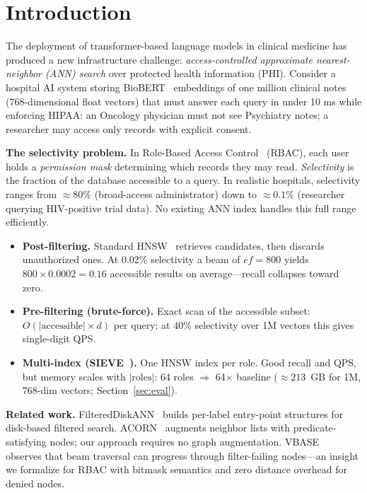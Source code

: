 \section{Introduction}
\label{sec:intro}

The deployment of transformer-based language models in clinical medicine
has produced a new infrastructure challenge: \emph{access-controlled approximate
nearest-neighbor (ANN) search} over protected health information (PHI).
Consider a hospital AI system storing BioBERT~\cite{lee2020biobert} embeddings
of one million clinical notes (768-dimensional float vectors) that must answer
each query in under 10 ms while enforcing HIPAA: an Oncology physician must not
see Psychiatry notes; a researcher may access only records with explicit consent.

\smallskip\noindent\textbf{The selectivity problem.}
In Role-Based Access Control~\cite{ferraiolo2001proposed} (RBAC), each user holds
a \emph{permission mask} determining which records they may read.
\emph{Selectivity} is the fraction of the database accessible to a query.
In realistic hospitals, selectivity ranges from ${\approx}80\%$ (broad-access
administrator) down to ${\approx}0.1\%$ (researcher querying HIV-positive trial data).
No existing ANN index handles this full range efficiently.

\begin{itemize}[leftmargin=1.4em,itemsep=1pt,topsep=2pt]
  \item \textbf{Post-filtering.} Standard HNSW~\cite{malkov2020efficient}
    retrieves candidates, then discards unauthorized ones.
    At 0.02\% selectivity a beam of $\mathit{ef}\!=\!800$ yields
    $800\!\times\!0.0002\!=\!0.16$ accessible results on average---recall
    collapses toward zero.
  \item \textbf{Pre-filtering (brute-force).} Exact scan of the accessible
    subset: $O(|\text{accessible}|\!\times\! d)$ per query; at 40\%
    selectivity over 1M vectors this gives single-digit QPS.
  \item \textbf{Multi-index (SIEVE~\cite{zhang2025sieve}).}
    One HNSW index per role.  Good recall and QPS, but memory scales
    with $|\text{roles}|$: 64 roles $\Rightarrow$ 64$\times$ baseline
    (${\approx}213$~GB for 1M, 768-dim vectors; Section~\ref{sec:eval}).
\end{itemize}

\smallskip\noindent\textbf{Related work.}
FilteredDiskANN~\cite{gollapudi2023filtered} builds per-label entry-point
structures for disk-based filtered search.
ACORN~\cite{patel2024acorn} augments neighbor lists with predicate-satisfying
nodes; our approach requires no graph augmentation.
VBASE~\cite{zhang2023vbase} observes that beam traversal can progress through
filter-failing nodes---an insight we formalize for RBAC with bitmask
semantics and zero distance overhead for denied nodes.


